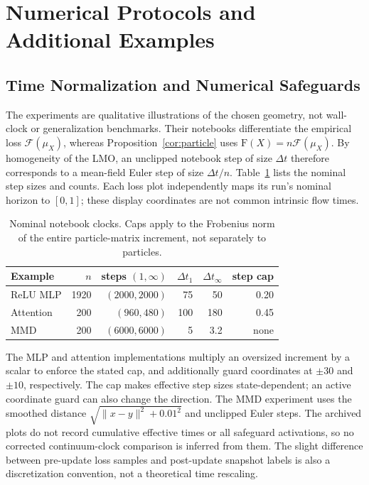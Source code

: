 \documentclass{article}
\newcommand{\mF}{\mathrm{F}}
\newcommand{\MF}{\mathcal{F}}
\begin{document}
\FloatBarrier
\section{Numerical Protocols and Additional Examples}
\label{app:extra-static-dynamic}
\subsection{Time Normalization and Numerical Safeguards}
\label{sec:numerical-protocol}
The experiments are qualitative illustrations of the chosen geometry, not
wall-clock or generalization benchmarks. Their notebooks differentiate the
empirical loss $\MF(\mu_X)$, whereas Proposition~\ref{cor:particle} uses
$\mF(X)=n\MF(\mu_X)$. By homogeneity of the LMO, an unclipped notebook
step of size $\Delta t$ therefore corresponds to a mean-field Euler step
of size $\Delta t/n$.
Table~\ref{tab:numerical-clocks} lists the nominal step sizes and counts.
Each loss plot independently maps its run's nominal horizon to $[0,1]$;
these display coordinates are not common intrinsic flow times.

\begin{table}[ht]
\centering
\begin{tabular}{lrrrrr}
\toprule
Example & $n$ & steps $(1,\infty)$ & $\Delta t_1$ & $\Delta t_\infty$ & step cap\\
\midrule
ReLU MLP & 1920 & $(2000,2000)$ & 75 & 50 & 0.20\\
Attention & 200 & $(960,480)$ & 100 & 180 & 0.45\\
MMD & 200 & $(6000,6000)$ & 5 & 3.2 & none\\
\bottomrule
\end{tabular}
\caption{Nominal notebook clocks. Caps apply to the Frobenius norm of the
entire particle-matrix increment, not separately to particles.}
\label{tab:numerical-clocks}
\end{table}

The MLP and attention implementations multiply an oversized increment by
a scalar to enforce the stated cap, and additionally guard coordinates at
$\pm30$ and $\pm10$, respectively. The cap makes effective step sizes
state-dependent; an active coordinate guard can also change the direction.
The MMD experiment uses the smoothed distance
$\sqrt{\|x-y\|^2+0.01^2}$ and unclipped Euler steps.
The archived plots do not record cumulative effective times or all safeguard
activations, so no corrected continuum-clock comparison is inferred from
them. The slight difference between pre-update loss samples and post-update
snapshot labels is also a discretization convention, not a theoretical time
rescaling.
\end{document}
